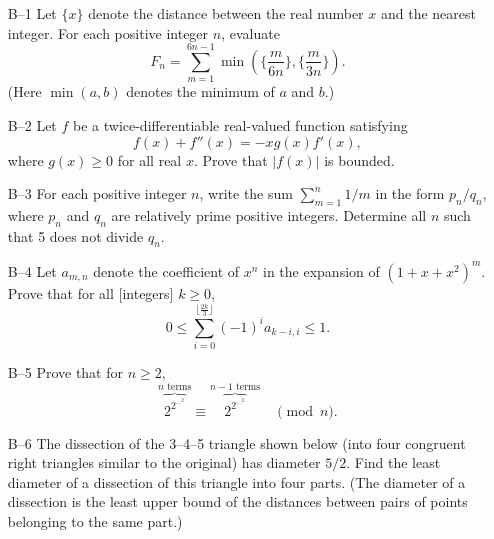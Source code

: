 \documentclass[amssymb,twocolumn,pra,10pt,aps]{revtex4-1}
\begin{document}
\begin{itemize}
\item[B--1]
Let $\{x\}$ denote the distance between the real number $x$ and the
nearest integer.  For each positive integer $n$, evaluate
\[F_n=\sum_{m=1}^{6n-1} \min(\{\frac{m}{6n}\},\{\frac{m}{3n}\}).\]
(Here $\min(a,b)$ denotes the minimum of $a$ and $b$.)

\item[B--2]
Let $f$ be a twice-differentiable real-valued function satisfying
\[f(x)+f''(x)=-xg(x)f'(x),\]
where $g(x)\geq 0$ for all real $x$.  Prove that $|f(x)|$ is bounded.

\item[B--3]
For each positive integer $n$, write the sum $\sum_{m=1}^n
1/m$ in the form $p_n/q_n$, where $p_n$ and $q_n$ are relatively prime
positive integers.  Determine all $n$ such that 5 does not divide $q_n$.

\item[B--4]
Let $a_{m,n}$ denote the coefficient of $x^n$ in the expansion of
$(1+x+x^2)^m$.  Prove that for all [integers] $k\geq 0$,
\[0\leq \sum_{i=0}^{\lfloor \frac{2k}{3}\rfloor} (-1)^i a_{k-i,i}\leq
1.\]

\item[B--5]
Prove that for $n\geq 2$,
\[
\overbrace{2^{2^{\cdots^{2}}}}^{\mbox{$n$ terms}} \equiv
\overbrace{2^{2^{\cdots^{2}}}}^{\mbox{$n-1$ terms}} \quad \pmod{n}.
\]

\item[B--6]
The dissection of the 3--4--5 triangle shown below (into four
congruent right triangles similar to the original)
has diameter $5/2$.
Find the least diameter of a dissection of this triangle into four parts.
(The diameter of a dissection is the least upper bound of the distances
between pairs of points belonging to the same part.)

\end{itemize}
\end{document}
